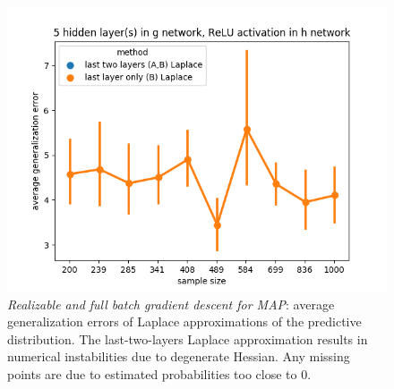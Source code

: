 \documentclass{article} %
\begin{document}
\begin{figure}[h!]
\begin{center}
		\includegraphics[scale=0.35]{laplace_taskid11.png}
	\end{center}
	\caption{\textit{Realizable and full batch gradient descent for MAP}: average generalization errors of Laplace approximations of the predictive distribution. The last-two-layers Laplace approximation results in numerical instabilities due to degenerate Hessian. Any missing points are due to estimated probabilities too close to 0. 
	}
	\label{fig:avg_gen_err_fullbatch_realizable_laplace}
\end{figure}
\end{document}
